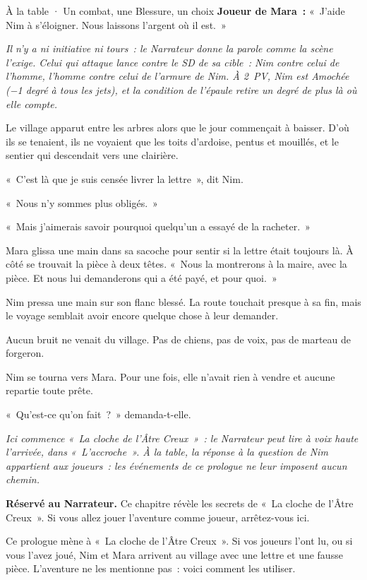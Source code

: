\documentclass[10pt,a4paper]{article}
\begin{document}
\begin{rpgexample}{À la table · Un combat, une Blessure, un choix}
\textbf{Joueur de Mara~:} «~J’aide Nim à s’éloigner. Nous laissons l’argent où il est.~»

\emph{Il n’y a ni initiative ni tours~: le Narrateur donne la parole comme la scène l’exige. Celui qui attaque lance contre le SD de sa cible~: Nim contre celui de l’homme, l’homme contre celui de l’armure de Nim. À 2~PV, Nim est Amochée (−1 degré à tous les jets), et la condition de l’épaule retire un degré de plus là où elle compte.}

\end{rpgexample}
\begingroup\setlength{\parskip}{2pt}
Le village apparut entre les arbres alors que le jour commençait à baisser. D’où ils se tenaient, ils ne voyaient que les toits d’ardoise, pentus et mouillés, et le sentier qui descendait vers une clairière.

«~C’est là que je suis censée livrer la lettre~», dit Nim.

«~Nous n’y sommes plus obligés.~»

«~Mais j’aimerais savoir pourquoi quelqu’un a essayé de la racheter.~»

Mara glissa une main dans sa sacoche pour sentir si la lettre était toujours là. À côté se trouvait la pièce à deux têtes. «~Nous la montrerons à la maire, avec la pièce. Et nous lui demanderons qui a été payé, et pour quoi.~»

Nim pressa une main sur son flanc blessé. La route touchait presque à sa fin, mais le voyage semblait avoir encore quelque chose à leur demander.

Aucun bruit ne venait du village. Pas de chiens, pas de voix, pas de marteau de forgeron.

Nim se tourna vers Mara. Pour une fois, elle n’avait rien à vendre et aucune repartie toute prête.

«~Qu’est-ce qu’on fait~?~» demanda-t-elle.

\emph{Ici commence «~La cloche de l’Âtre Creux~»~: le Narrateur peut lire à voix haute l’arrivée, dans «~L’accroche~». À la table, la réponse à la question de Nim appartient aux joueurs~: les événements de ce prologue ne leur imposent aucun chemin.}
\endgroup
\clearpage
{}
\begin{rpgnote}
\textbf{Réservé au Narrateur.} Ce chapitre révèle les secrets de «~La cloche de l’Âtre Creux~». Si vous allez jouer l’aventure comme joueur, arrêtez-vous ici.
\end{rpgnote}
Ce prologue mène à «~La cloche de l’Âtre Creux~». Si vos joueurs l’ont lu, ou si vous l’avez joué, Nim et Mara arrivent au village avec une lettre et une fausse pièce. L’aventure ne les mentionne pas~: voici comment les utiliser.
\end{document}
